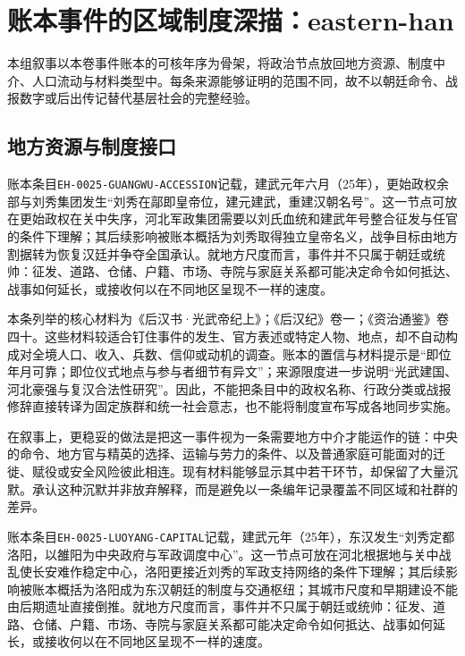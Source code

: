 \section{账本事件的区域制度深描：eastern-han}

\label{sec:ledger-depth-eastern-han}

本组叙事以本卷事件账本的可核年序为骨架，将政治节点放回地方资源、制度中介、人口流动与材料类型中。每条来源能够证明的范围不同，故不以朝廷命令、战报数字或后出传记替代基层社会的完整经验。

\subsection{地方资源与制度接口}

账本条目\texttt{EH-0025-GUANGWU-ACCESSION}记载，建武元年六月（25年），更始政权余部与刘秀集团发生“刘秀在鄗即皇帝位，建元建武，重建汉朝名号”。这一节点可放在更始政权在关中失序，河北军政集团需要以刘氏血统和建武年号整合征发与任官的条件下理解；其后续影响被账本概括为刘秀取得独立皇帝名义，战争目标由地方割据转为恢复汉廷并争夺全国承认。就地方尺度而言，事件并不只属于朝廷或统帅：征发、道路、仓储、户籍、市场、寺院与家庭关系都可能决定命令如何抵达、战事如何延长，或接收何以在不同地区呈现不一样的速度。

本条列举的核心材料为《后汉书·光武帝纪上》；《后汉纪》卷一；《资治通鉴》卷四十。这些材料较适合钉住事件的发生、官方表述或特定人物、地点，却不自动构成对全境人口、收入、兵数、信仰或动机的调查。账本的置信与材料提示是“即位年月可靠；即位仪式地点与参与者细节有异文”；来源限度进一步说明“光武建国、河北豪强与复汉合法性研究”。因此，不能把条目中的政权名称、行政分类或战报修辞直接转译为固定族群和统一社会意志，也不能将制度宣布写成各地同步实施。

在叙事上，更稳妥的做法是把这一事件视为一条需要地方中介才能运作的链：中央的命令、地方官与精英的选择、运输与劳力的条件、以及普通家庭可能面对的迁徙、赋役或安全风险彼此相连。现有材料能够显示其中若干环节，却保留了大量沉默。承认这种沉默并非放弃解释，而是避免以一条编年记录覆盖不同区域和社群的差异。

账本条目\texttt{EH-0025-LUOYANG-CAPITAL}记载，建武元年（25年），东汉发生“刘秀定都洛阳，以雒阳为中央政府与军政调度中心”。这一节点可放在河北根据地与关中战乱使长安难作稳定中心，洛阳更接近刘秀的军政支持网络的条件下理解；其后续影响被账本概括为洛阳成为东汉朝廷的制度与交通枢纽；其城市尺度和早期建设不能由后期遗址直接倒推。就地方尺度而言，事件并不只属于朝廷或统帅：征发、道路、仓储、户籍、市场、寺院与家庭关系都可能决定命令如何抵达、战事如何延长，或接收何以在不同地区呈现不一样的速度。

